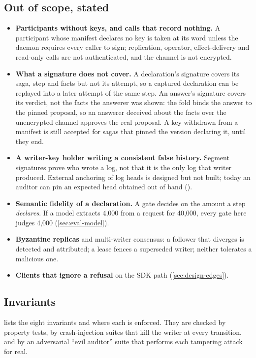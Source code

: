 \subsection{Out of scope, stated}
\label{sec:model-out}
\begin{itemize}
\item \textbf{Participants without keys, and calls that record nothing.} A
  participant whose manifest declares no key is taken at its word unless the
  daemon requires every caller to sign; replication, operator, effect-delivery
  and read-only calls are not authenticated, and the channel is not encrypted.
\item \textbf{What a signature does not cover.} A declaration's signature covers
  its saga, step and facts but not its attempt, so a captured declaration can be
  replayed into a later attempt of the same step. An answer's signature covers
  its verdict, not the facts the answerer was shown: the fold binds the answer to
  the pinned proposal, so an answerer deceived about the facts over the
  unencrypted channel approves the real proposal. A key withdrawn from a manifest
  is still accepted for sagas that pinned the version declaring it, until they
  end.
\item \textbf{A writer-key holder writing a consistent false history.} Segment
  signatures prove who wrote a log, not that it is the only log that writer
  produced. External anchoring of log heads is designed but not built; today an
  auditor can pin an expected head obtained out of band ().
\item \textbf{Semantic fidelity of a declaration.} A gate decides on the amount a
  step \emph{declares}. If a model extracts 4{,}000 from a request for 40{,}000,
  every gate here judges 4{,}000 (\cref{sec:eval-model}).
\item \textbf{Byzantine replicas} and multi-writer consensus: a follower that
  diverges is detected and attributed; a lease fences a superseded writer; neither
  tolerates a malicious one.
\item \textbf{Clients that ignore a refusal} on the SDK path (\cref{sec:design-edges}).
\end{itemize}

\subsection{Invariants}
 lists the eight invariants and where each is enforced.
They are checked by property tests, by crash-injection suites that kill the
writer at every transition, and by an adversarial ``evil auditor'' suite that
performs each tampering attack for real.

